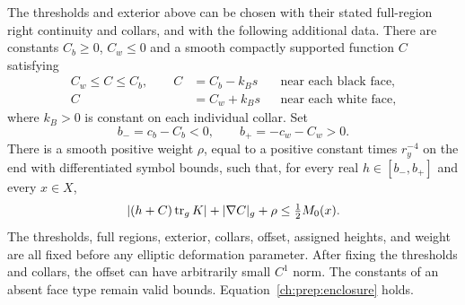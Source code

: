 \begin{proposition}
\label{ch:prep:prepared}
The thresholds and exterior above can be chosen with their stated
full-region right continuity and collars, and with the following
additional data.  There are constants $C_b\geq0$, $C_w\leq0$ and
a smooth compactly supported function $C$ satisfying
\begin{equation}\label{ch:prep:offsets}
 \begin{aligned}
 C_w\leq C\leq C_b,\qquad
 C&=C_b-k_Bs &&\text{near each black face},\\
 C&=C_w+k_Bs &&\text{near each white face},
 \end{aligned}
\end{equation}
where $k_B>0$ is constant on each individual collar.  Set
\begin{equation}\label{ch:prep:heights}
 b_-=c_b-C_b<0,\qquad b_+=-c_w-C_w>0.
\end{equation}
There is a smooth positive weight $\rho$, equal to a positive
constant times $r_y^{-4}$ on the end with differentiated symbol
bounds, such that, for every real $h\in[b_-,b_+]$ and every $x\in X$,
\begin{equation}\label{ch:prep:offset-smallness}
 |(h+C)\operatorname{tr}_gK|+|\nabla C|_g+\rho\leq\tfrac12M_0(x).
\end{equation}
The thresholds, full regions, exterior, collars, offset, assigned
heights, and weight are all fixed before any elliptic deformation
parameter.  After fixing the thresholds and collars, the offset can
have arbitrarily small $C^1$ norm.  The constants of an absent face
type remain valid bounds.  Equation~\eqref{ch:prep:enclosure} holds.
\end{proposition}

